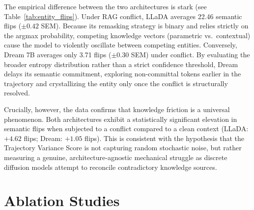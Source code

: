 \documentclass[11pt]{article}
\begin{document}
The empirical difference between the two architectures is stark (see Table~\ref{tab:entity_flips}). Under RAG conflict, LLaDA averages 22.46 semantic flips ($\pm 0.42$ SEM). Because its remasking strategy is binary and relies strictly on the argmax probability, competing knowledge vectors (parametric vs.\ contextual) cause the model to violently oscillate between competing entities. Conversely, Dream 7B averages only 3.71 flips ($\pm 0.30$ SEM) under conflict. By evaluating the broader entropy distribution rather than a strict confidence threshold, Dream delays its semantic commitment, exploring non-committal tokens earlier in the trajectory and crystallizing the entity only once the conflict is structurally resolved.

Crucially, however, the data confirms that knowledge friction is a universal phenomenon. Both architectures exhibit a statistically significant elevation in semantic flips when subjected to a conflict compared to a clean context (LLaDA: $+4.62$ flips; Dream: $+1.05$ flips). This is consistent with the hypothesis that the Trajectory Variance Score is not capturing random stochastic noise, but rather measuring a genuine, architecture-agnostic mechanical struggle as discrete diffusion models attempt to reconcile contradictory knowledge sources.

\begin{table}[ht]
    \centering
    \caption{Entity Flip Rate across architectures under clean and conflicting RAG contexts. Both models exhibit a statistically significant elevation in semantic flips when subjected to a conflict. LLaDA's confidence-based remasking results in significantly higher baseline volatility and conflict oscillation compared to Dream's smoother entropy-based approach.}
    \label{tab:entity_flips}
\end{table}

\section{Ablation Studies}
\label{sec:ablation}
\end{document}
